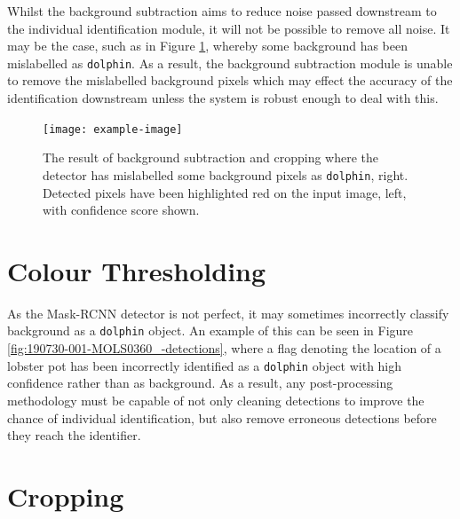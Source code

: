 
Whilst the background subtraction aims to reduce noise passed downstream to the individual identification module, it will not be possible to remove all noise. It may be the case, such as in Figure \ref{fig:fin-extraction-unclean}, whereby some background has been mislabelled as \texttt{dolphin}. As a result, the background subtraction module is unable to remove the mislabelled background pixels which may effect the accuracy of the identification downstream unless the system is robust enough to deal with this.

\begin{figure}[h]
	\begin{center}
		\texttt{[image: example-image]}
	\end{center}
	\caption{The result of background subtraction and cropping where the detector has mislabelled some background pixels as \texttt{dolphin}, right. Detected pixels have been highlighted red on the input image, left, with confidence score shown.}
	\label{fig:fin-extraction-unclean}
\end{figure}



\section{Colour Thresholding}\label{ch:postProcessing,sec:splittingByComponent}

As the Mask-RCNN detector is not perfect, it may sometimes incorrectly classify background as a \texttt{dolphin} object. An example of this can be seen in Figure \ref{fig:190730-001-MOLS0360_-detections}, where a flag denoting the location of a lobster pot has been incorrectly identified as a \texttt{dolphin} object with high confidence rather than as background. As a result, any post-processing methodology must be capable of not only cleaning detections to improve the chance of individual identification, but also remove erroneous detections before they reach the identifier. 



\section{Cropping}\label{ch:postProcessing,sec:cropping}


